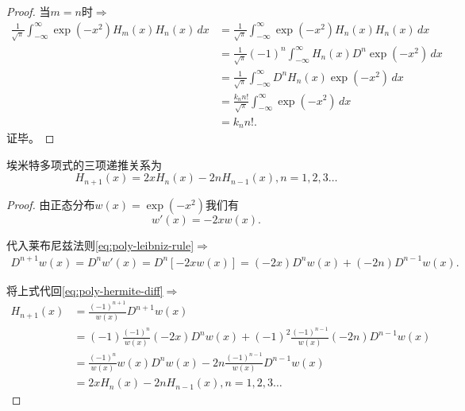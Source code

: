 \begin{subappendices}
\begin{proof}
当$m=n$时$\Rightarrow$
\begin{equation*}
  \begin{split}
    \frac{1}{\sqrt{\pi}}  \int_{-\infty}^{\infty} \exp(-x^2) H_m(x) H_n(x) \, dx &= \frac{1}{\sqrt{\pi}} \int_{-\infty}^{\infty} \exp{(-x^2)} H_n(x) H_n(x) \, dx\\
    &=\frac{1}{\sqrt{\pi}} (-1)^n \int_{-\infty}^{\infty}  H_n(x) D^n \exp(-x^2) \, dx\\
    &=\frac{1}{\sqrt{\pi}} \int_{-\infty}^{\infty}  D^n H_n(x)  \exp(-x^2) \, dx\\
    &=\frac{k_n n!}{\sqrt{\pi}} \int_{-\infty}^{\infty} \exp (-x^2) \, dx \\
    &= k_n n!.
  \end{split}
\end{equation*}
证毕。
\end{proof}

\begin{theorem}[埃米特多项式的三项递推关系]
  埃米特多项式的三项递推关系为
  \begin{equation}
    \label{poly-hermite-three-term-recurrence-relation}
    H_{n+1}(x) = 2x H_n(x) - 2n H_{n-1}(x), n=1,2,3\ldots
  \end{equation}
\end{theorem}
\begin{proof}
由正态分布$w(x)=\exp(-x^2)$我们有
\begin{equation*}
  w'(x) = -2x w(x).
\end{equation*}

代入莱布尼兹法则\eqref{eq:poly-leibniz-rule}$\Rightarrow$
\begin{equation*}
  \begin{split}
    D^{n+1}w(x) = D^n w'(x) =D^n \left[ -2x w(x) \right] = (-2x) D^n w(x) + (-2n) D^{n-1} w(x).
  \end{split}
\end{equation*}

将上式代回\eqref{eq:poly-hermite-diff}$\Rightarrow$
\begin{equation*}
  \begin{split}
    H_{n+1}(x) &= \frac{(-1)^{n+1}}{w(x)} D^{n+1}w(x)\\ %
    &= (-1) \frac{(-1)^n}{w(x)} (-2x) D^n w(x) + (-1)^2  \frac{(-1)^{n-1}}{w(x)} (-2n) D^{n-1}w(x) \\
    &= \frac{(-1)^{n}}{w(x)} w(x) D^n w(x) - 2n \frac{(-1)^{n-1}}{w(x)}D^{n-1}w(x)\\
    &=2x H_n(x) - 2n H_{n-1}(x), n=1,2,3\ldots
  \end{split}
\end{equation*}
\end{proof}


\end{subappendices}
